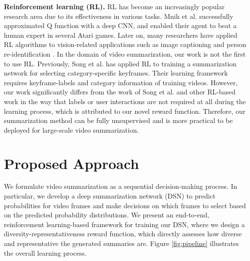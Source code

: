 \documentclass[letterpaper]{article} \usepackage{aaai18}  \usepackage{times}  \usepackage{helvet}  \usepackage{courier}  \usepackage{url}  \usepackage{graphicx}
\begin{document}
{\bf Reinforcement learning (RL).}
RL has become an increasingly popular research area due to its effectiveness in various tasks. Mnih et al. \cite{mnih2013playing} successfully approximated Q function with a deep CNN, and enabled their agent to beat a human expert in several Atari games. Later on, many researchers have applied RL algorithms to vision-related applications such as image captioning \cite{xu2015show} and person re-identification \cite{xulan2017reid}. In the domain of video summarization, our work is not the first to use RL. Previously, Song et al. \cite{song2016category} has applied RL to training a summarization network for selecting category-specific keyframes. Their learning framework requires keyframe-labels and category information of training videos. However, our work significantly differs from the work of Song et al. and other RL-based work in the way that labels or user interactions are not required at all during the learning process, which is attributed to our novel reward function. Therefore, our summarization method can be fully unsupervised and is more practical to be deployed for large-scale video summarization.

\section{Proposed Approach}
We formulate video summarization as a sequential decision-making process. In particular, we develop a deep summarization network (DSN) to predict probabilities for video frames and make decisions on which frames to select based on the predicted probability distributions. We present an end-to-end, reinforcement learning-based framework for training our DSN, where we design a diversity-representativeness reward function, which directly assesses how diverse and representative the generated summaries are. Figure \ref{fig:pipeline} illustrates the overall learning process.
\end{document}
